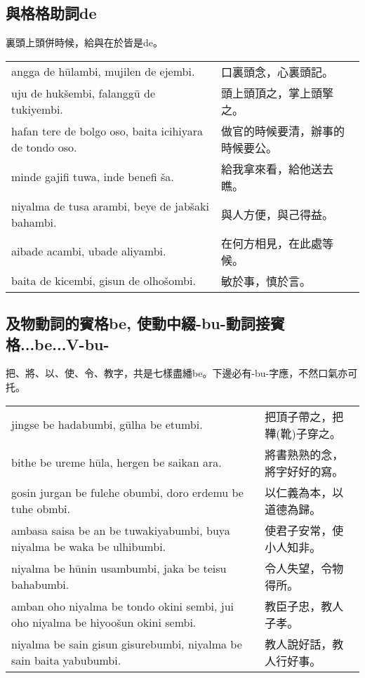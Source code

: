 \documentclass{article}
\begin{document}
\subsection{與格格助詞de}
\noindent 裏頭上頭併時候，給與在於皆是de。
\begin{center}
    \begin{tabularx}{\textwidth}{XX}
        angga de h\={u}lambi, mujilen de ejembi. &
        口裏頭念，心裏頭記。\\
         uju de huk\v{s}embi, falangg\={u} de tukiyembi. & 頭上頭頂之，掌上頭擎之。\\
         hafan tere de bolgo oso, baita icihiyara de tondo oso.& 做官的時候要清，辦事的時候要公。\\
         minde gajifi tuwa, inde benefi \v{s}a.&給我拿來看，給他送去瞧。\\
         niyalma de tusa arambi, beye de jab\v{s}aki bahambi.&與人方便，與己得益。\\
         aibade acambi, ubade aliyambi.&在何方相見，在此處等候。\\
         baita de kicembi, gisun de olho\v{s}ombi.&敏於事，慎於言。
    \end{tabularx}
\end{center}

\subsection{及物動詞的賓格be, 使動中綴-bu-動詞接賓格...be...V-bu-}
\noindent 把、將、以、使、令、教字，共是七樣盡繙be。下邊必有-bu-字應，不然口氣亦可托。
\begin{center}
    \begin{tabularx}{\textwidth}{XX}
        jingse be hadabumbi, g\={u}lha be etumbi.&把頂子帶之，把鞾(靴)子穿之。\\
        bithe be ureme h\={u}la, hergen be saikan ara.&將書熟熟的念，將字好好的寫。\\
        gosin jurgan be fulehe obumbi, doro erdemu be tuhe obmbi.&以仁義為本，以道德為歸。\\
        ambasa saisa be an be tuwakiyabumbi, buya niyalma be waka be ulhibumbi.&使君子安常，使小人知非。\\
        niyalma be h\={u}nin usambumbi, jaka be teisu bahabumbi.&令人失望，令物得所。\\
        amban oho niyalma be tondo okini sembi, jui oho niyalma be hiyoo\v{s}un okini sembi.&教臣子忠，教人子孝。\\
        niyalma be sain gisun gisurebumbi, niyalma be sain baita yabubumbi.&教人說好話，教人行好事。
    \end{tabularx}
\end{center}
\end{document}
